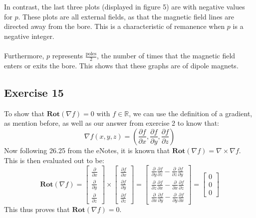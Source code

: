 \documentclass{article}
\begin{document}
\\
\\
In contrast, the last three plots (displayed in figure 5) are with negative values for $p$. These plots are all external fields, as that the magnetic field lines are directed away from the bore. This is a characteristic of remanence when $p$ is a negative integer.
\\
\\
Furthermore, $p$ represents $\frac{\mathrm{poles}}{2}$, the number of times that the magnetic field enters or exits the bore. This shows that these graphs are of dipole magnets.



\subsection{Exercise 15}
To show that $\mathbf{Rot}(\nabla f) = 0$ with $f \in  \mathbb{R}$, we can use the definition of a gradient, as mention before, as well as our answer from exercise 2 to know that:
\begin{equation}
    \nabla f\left(x,y,z\right) = (\frac{\partial f}{\partial x},\frac{\partial f}{\partial y},\frac{\partial f}{\partial z})
\end{equation}
Now following 26.25 from the eNotes, it is known that $\mathbf{Rot}(\nabla f) = \nabla \times \nabla f$.
\\
This is then evaluated out to be:
\begin{equation}
    \mathbf{Rot}(\nabla f) = 
\left[\begin{array}{c}
\frac{\partial}{\partial x} 
\\
 \frac{\partial}{\partial y} 
\\
 \frac{\partial}{\partial z} 
\end{array}\right]
\times 
\left[\begin{array}{c}
\frac{\partial f}{\partial x} 
\\
 \frac{\partial f}{\partial y} 
\\
 \frac{\partial f}{\partial z} 
\end{array}\right]
=
\left[\begin{array}{c}
\frac{\partial}{\partial y}\frac{\partial f}{\partial z}-\frac{\partial}{\partial z}\frac{\partial f}{\partial y} 
\\
 \frac{\partial}{\partial z}\frac{\partial f}{\partial x}-\frac{\partial}{\partial x}\frac{\partial f}{\partial z} 
\\
 \frac{\partial}{\partial x}\frac{\partial f}{\partial y}-\frac{\partial}{\partial y}\frac{\partial f}{\partial x} 
\end{array}\right]
=
\left[\begin{array}{c}
0 
\\
 0 
\\
 0 
\end{array}\right]
\end{equation}
This thus proves that $\mathbf{Rot}(\nabla f) =  0$.
\end{document}
